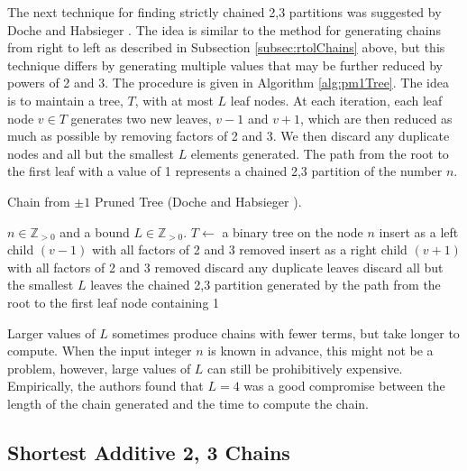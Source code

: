 \documentclass{ucalgthes1}
\theoremstyle{definition}
\newcommand{\ZZgtz}{\mathbb{Z}_{>0}}
\begin{document}
The next technique for finding strictly chained 2,3 partitions was suggested by Doche and Habsieger \cite{Doche2008}. The idea is similar to the method for generating chains from right to left as described in Subsection \ref{subsec:rtolChains} above, but this technique differs by generating multiple values that may be further reduced by powers of 2 and 3. The procedure is given in Algorithm \ref{alg:pm1Tree}.  The idea is to maintain a tree, $T$, with at most $L$ leaf nodes. At each iteration, each leaf node $v \in T$ generates two new leaves, $v-1$ and $v+1$, which are then reduced as much as possible by removing factors of 2 and 3.  We then discard any duplicate nodes and all but the smallest $L$ elements generated. The path from the root to the first leaf with a value of 1 represents a chained 2,3 partition of the number $n$.

\begin{algorithm}[htb]
\caption{Chain from $\pm 1$ Pruned Tree (Doche and Habsieger \cite{Doche2008}).}
\label{alg:pm1Tree}
\begin{algorithmic}[1]
\Require $n \in \ZZgtz$ and a bound $L \in \ZZgtz$.
\State $T \gets$ a binary tree on the node $n$
		\State insert as a left child $(v - 1)$ with all factors of 2 and 3 removed
		\State insert as a right child $(v + 1)$ with all factors of 2 and 3 removed
	\EndFor
	\State discard any duplicate leaves
	\State discard all but the smallest $L$ leaves
\EndWhile
\State \Return the chained 2,3 partition generated by the path from the root to the first leaf node containing 1
\end{algorithmic}
\end{algorithm}

Larger values of $L$ sometimes produce chains with fewer terms, but take longer to compute.  When the input integer $n$ is known in advance, this might not be a problem, however, large values of $L$ can still be prohibitively expensive.  Empirically, the authors found that $L=4$ was a good compromise between the length of the chain generated and the time to compute the chain. 


\subsection{Shortest Additive 2, 3 Chains}
\label{subsec:shortAddChains}
\end{document}
